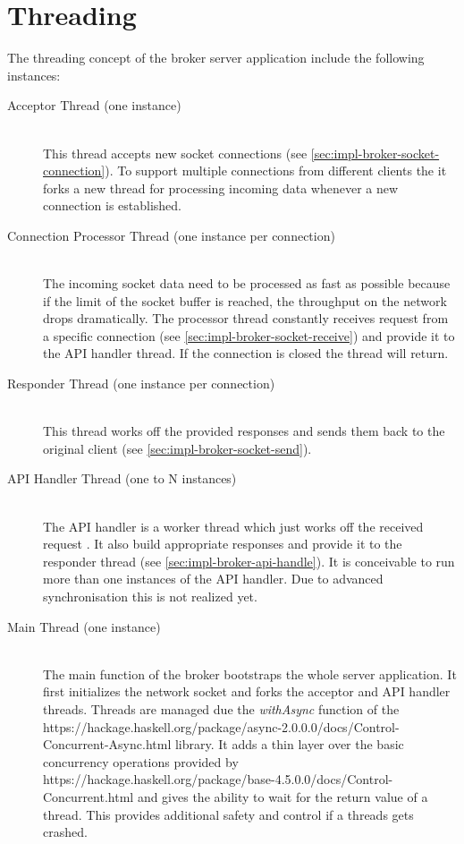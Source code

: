 \section{Threading}
\label{sec:impl-broker-threading}
The threading concept of the broker server application include the following
instances: 

\begin{description}
\item[Acceptor Thread (one instance)] \hfill \\
    This thread accepts new socket connections (see
    \ref{sec:impl-broker-socket-connection}). To support multiple connections from
    different clients the it forks a new thread for processing incoming data
    whenever a new connection is established. 

\item[Connection Processor Thread (one instance per connection)] \hfill \\
    The incoming socket data need to be processed as fast as possible because if the
    limit of the socket buffer is reached, the throughput on the network drops
    dramatically. The processor thread constantly receives request
    from a specific connection (see \ref{sec:impl-broker-socket-receive}) and
    provide it to the API handler thread. If the connection is closed the
    thread will return. 

\item[Responder Thread (one instance per connection)] \hfill \\
    This thread works off the provided responses and sends them back to the original
    client (see \ref{sec:impl-broker-socket-send}).  \item [API Handler Thread (one to N instances)] \hfill
    \\
    The API handler is a worker thread which just works off the received request . It
    also build appropriate responses and provide it to the responder thread
    (see \ref{sec:impl-broker-api-handle}). It is conceivable to run more than
    one instances of the API handler. Due to advanced synchronisation this is
    not realized yet.
\item [Main Thread (one instance)] \hfill \\
    The main function of the broker bootstraps the whole server application. It first
    initializes the network socket and forks the acceptor and API
    handler threads. Threads are managed due the \textit{withAsync} function of
    the 
    {https://hackage.haskell.org/package/async-2.0.0.0/docs/Control-Concurrent-Async.html}
    library. It adds a thin layer over the basic concurrency operations provided
    by 
    {https://hackage.haskell.org/package/base-4.5.0.0/docs/Control-Concurrent.html}
    and gives the ability to wait for the return value of a thread. This
    provides additional safety and control if a threads gets crashed. 
\end{description}

